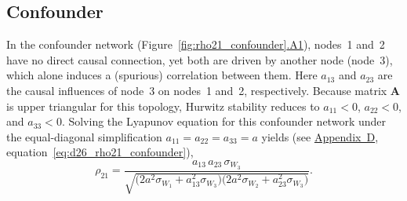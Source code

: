 \documentclass[12pt]{article}
\begin{document}
\subsection*{Confounder}

In the confounder network
(Figure~\ref{fig:rho21_confounder}\hyperref[fig:confounder_A1]{.A1}), nodes~1 and~2 have no direct causal connection, yet both are
driven by another node (node~3), which alone induces a (spurious)
correlation between them.
Here $a_{13}$ and $a_{23}$ are the causal influences of
node~3 on nodes~1 and~2, respectively. Because matrix $\mathbf{A}$ is upper triangular for this topology,
Hurwitz stability reduces to $a_{11}<0$, $a_{22}<0$, and
$a_{33}<0$.
Solving the Lyapunov equation for this confounder network
under the equal-diagonal simplification
$a_{11}=a_{22}=a_{33}=a$ yields (see
\hyperref[app:appD]{Appendix~D},
equation~\ref{eq:d26_rho21_confounder}),
\begin{equation}
\rho_{21} = \frac{
  a_{13}\,a_{23}\,\sigma_{W_3}
}{
  \sqrt{
    \bigl(2a^2\sigma_{W_1}+a_{13}^2\sigma_{W_3}\bigr)
    \bigl(2a^2\sigma_{W_2}+a_{23}^2\sigma_{W_3}\bigr)
  }
}.
\label{eq:rho21_confounder}
\end{equation}
\end{document}
